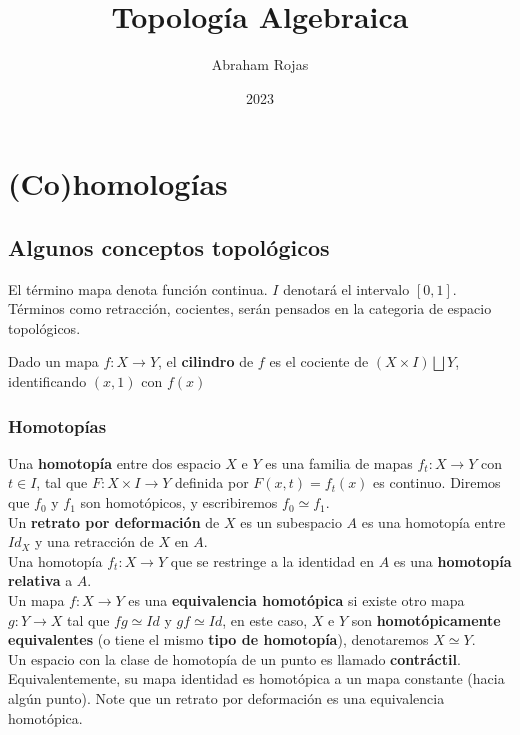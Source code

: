 \documentclass[12pt]{book}
\begin{document}
\large	
	\title{Topología Algebraica}	
	\author{Abraham Rojas}
	\date{2023}
	
	\maketitle
	\tableofcontents
	\part{(Co)homologías}


\chapter{Algunos conceptos topológicos}

El término mapa denota función continua. $I$ denotará el intervalo $[0,1]$. Términos como retracción, cocientes, serán pensados en la categoria de espacio topológicos.

Dado un mapa $f: X \rightarrow Y$, el \textbf{cilindro} de $f$ es el cociente de $ (X\times I )  \bigsqcup Y $, identificando $(x,1)$ con $f(x)$


\section{Homotopías}

Una \textbf{homotopía} entre dos espacio $X$ e $Y$ es una familia de mapas $f_t: X \rightarrow Y$ con $t\in I$, tal que $F: X \times I \rightarrow Y$ definida por $F(x,t ) = f_t (x)$ es continuo. Diremos que $f_0 $ y $f_1$ son homotópicos, y escribiremos $f_0 \simeq f_1$.\\

Un \textbf{retrato por deformación} de $X$ es un subespacio $A$ es una homotopía entre $Id_X$ y una retracción de $X$ en $A$.\\
Una homotopía $f_t : X\rightarrow Y$ que se restringe a la identidad en $A$ es una \textbf{homotopía relativa} a $A$.\\

Un mapa $f: X \rightarrow Y$ es una \textbf{equivalencia homotópica} si existe otro mapa $g: Y \rightarrow X$ tal que $fg \simeq Id$ y  $gf \simeq Id$, en este caso, $X$ e $Y$ son \textbf{homotópicamente equivalentes} (o tiene el mismo \textbf{tipo de homotopía}), denotaremos $X \simeq Y$.\\
Un espacio con la clase de homotopía de un punto es llamado \textbf{contráctil}. Equivalentemente, su mapa identidad es homotópica a un mapa constante (hacia algún punto).
Note que un retrato por deformación es una equivalencia homotópica.
\end{document}
